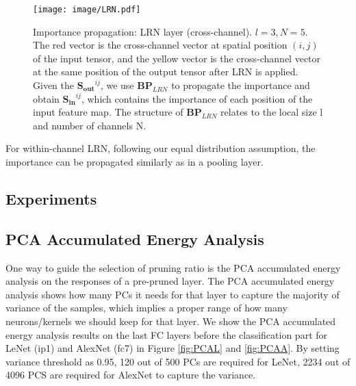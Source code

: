 \documentclass[10pt,twocolumn,letterpaper]{article}
\begin{document}
\begin{figure}[t]
\begin{center}
   \texttt{[image: image/LRN.pdf]}
\end{center}
   \caption{Importance propagation: LRN layer (cross-channel). $l=3, N=5$. The red vector is the cross-channel vector at spatial position $(i,j)$ of the input tensor, and the yellow vector is the cross-channel vector at the same position of the output tensor after LRN is applied. Given the $\mathbf{S_{out}}^{ij}$, we use $\mathbf{BP}_{LRN}$ to propagate the importance and obtain $\mathbf{S_{in}}^{ij}$, which contains the importance of each position of the input feature map. The structure of $\mathbf{BP}_{LRN}$ relates to the local size l and number of channels N.}
\label{fig:lrn}
\end{figure}

For within-channel LRN, following our equal distribution assumption, the importance can be propagated similarly as in a pooling layer.

\subsection{Experiments}\subsection{PCA Accumulated Energy Analysis}
One way to guide the selection of pruning ratio is the PCA accumulated energy analysis \cite{Nonlinear} on the responses of a pre-pruned layer. The PCA accumulated energy analysis shows how many PCs it needs for that layer to capture the majority of variance of the samples, which implies a proper range of how many neurons/kernels we should keep for that layer. We show the PCA accumulated energy analysis results on the last FC layers before the classification part for LeNet (ip1) and AlexNet (fc7) in Figure \ref{fig:PCAL} and \ref{fig:PCAA}. By setting variance threshold as 0.95, 120 out of 500 PCs are required for LeNet, 2234 out of 4096 PCS are required for AlexNet to capture the variance.
\end{document}
